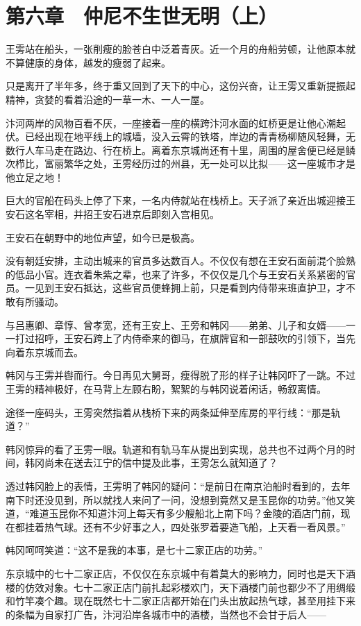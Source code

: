 \section{第六章　仲尼不生世无明（上）}

王雱站在船头，一张削瘦的脸苍白中泛着青灰。近一个月的舟船劳顿，让他原本就不算健康的身体，越发的瘦弱了起来。

只是离开了半年多，终于重又回到了天下的中心，这份兴奋，让王雱又重新提振起精神，贪婪的看着沿途的一草一木、一人一屋。

汴河两岸的风物百看不厌，一座接着一座的横跨汴河水面的虹桥更是让他心潮起伏。已经出现在地平线上的城墙，没入云霄的铁塔，岸边的青青杨柳随风轻舞，无数行人车马走在路边、行在桥上。离着东京城尚还有十里，周围的屋舍便已经是鳞次栉比，富丽繁华之处，王雱经历过的州县，无一处可以比拟——这一座城市才是他立足之地！

巨大的官船在码头上停了下来，一名内侍就站在栈桥上。天子派了亲近出城迎接王安石这名宰相，并招王安石进京后即刻入宫相见。

王安石在朝野中的地位声望，如今已是极高。

没有朝廷安排，主动出城来的官员多达数百人。不仅仅有想在王安石面前混个脸熟的低品小官。连衣着朱紫之辈，也来了许多，不仅仅是几个与王安石关系紧密的官员。一见到王安石抵达，这些官员便蜂拥上前，只是看到内侍带来班直护卫，才不敢有所骚动。

与吕惠卿、章惇、曾孝宽，还有王安上、王旁和韩冈——弟弟、儿子和女婿——一一打过招呼，王安石跨上了内侍牵来的御马，在旗牌官和一部鼓吹的引领下，当先向着东京城而去。

韩冈与王雱并辔而行。今日再见大舅哥，瘦得脱了形的样子让韩冈吓了一跳。不过王雱的精神极好，在马背上左顾右盼，絮絮的与韩冈说着闲话，畅叙离情。

途径一座码头，王雱突然指着从栈桥下来的两条延伸至库房的平行线：“那是轨道？”

韩冈惊异的看了王雱一眼。轨道和有轨马车从提出到实现，总共也不过两个月的时间，韩冈尚未在送去江宁的信中提及此事，王雱怎么就知道了？

透过韩冈脸上的表情，王雱明了韩冈的疑问：“是前日在南京泊船时看到的，去年南下时还没见到，所以就找人来问了一问，没想到竟然又是玉昆你的功劳。”他又笑道，“难道玉昆你不知道汴河上每天有多少艘船北上南下吗？金陵的酒店门前，现在都挂着热气球。还有不少好事之人，四处张罗着要造飞船，上天看一看风景。”

韩冈呵呵笑道：“这不是我的本事，是七十二家正店的功劳。”

东京城中的七十二家正店，不仅仅在东京城中有着莫大的影响力，同时也是天下酒楼的仿效对象。七十二家正店门前扎起彩楼欢门，天下酒楼门前也都少不了用绸缎和竹竿凑个趣。现在既然七十二家正店都开始在门头出放起热气球，甚至用挂下来的条幅为自家打广告，汴河沿岸各城市中的酒楼，当然也不会甘于后人——

